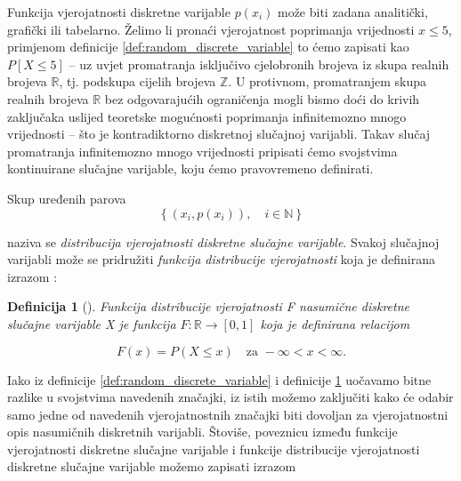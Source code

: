\documentclass[a4paper,12pt,oneside]{memoir}
\newtheorem{definition}{Definicija}[chapter]
\begin{document}
                Funkcija vjerojatnosti diskretne varijable $p(x_i)$ može biti zadana analitički, grafički ili tabelarno. Želimo li pronaći vjerojatnost poprimanja vrijednosti $x\leq5$, primjenom definicije \ref{def:random_discrete_variable} to ćemo zapisati kao $P[X\leq 5]$ -- uz uvjet promatranja isključivo cjelobronih brojeva iz skupa realnih brojeva $\mathbb{R}$, tj. podskupa cijelih brojeva $\mathbb{Z}$. U protivnom, promatranjem skupa realnih brojeva $\mathbb{R}$ bez odgovarajućih ograničenja mogli bismo doći do krivih zaključaka uslijed teoretske mogućnosti poprimanja infinitemozno mnogo vrijednosti -- što je kontradiktorno diskretnoj slučajnoj varijabli. Takav slučaj promatranja infinitemozno mnogo vrijednosti pripisati ćemo svojstvima kontinuirane slučajne varijable, koju ćemo pravovremeno definirati.

                Skup uređenih parova
                \begin{equation}
                    \left\{\left(x_i,p(x_i)\right), \quad i\in\mathbb{N}\right\}
                \end{equation}
                
                naziva se \textit{distribucija vjerojatnosti diskretne slučajne varijable}. Svakoj slučajnoj varijabli može se pridružiti \textit{funkcija distribucije vjerojatnosti} koja je definirana izrazom \cite{Bahovec}:

                \begin{definition}[\cite{Dekking}]
                    Funkcija distribucije vjerojatnosti F nasumične diskretne slučajne varijable X je funkcija $F:\mathbb{R}\to\left[0,1\right]$ koja je definirana relacijom

                    \begin{equation}
                        F(x)=P(X\leq x)     \quad   \text{za } -\infty<x<\infty.
                    \end{equation}
                    \label{def:random_discrete_distribution_function}
                \end{definition}

                Iako iz definicije \ref{def:random_discrete_variable} i definicije \ref{def:random_discrete_distribution_function} uočavamo bitne razlike u svojstvima navedenih značajki, iz istih možemo zaključiti kako će odabir samo jedne od navedenih vjerojatnostnih značajki biti dovoljan za vjerojatnostni opis nasumičnih diskretnih varijabli. Štoviše, poveznicu između funkcije vjerojatnosti diskretne slučajne varijable i funkcije distribucije vjerojatnosti diskretne slučajne varijable možemo zapisati izrazom
\end{document}
